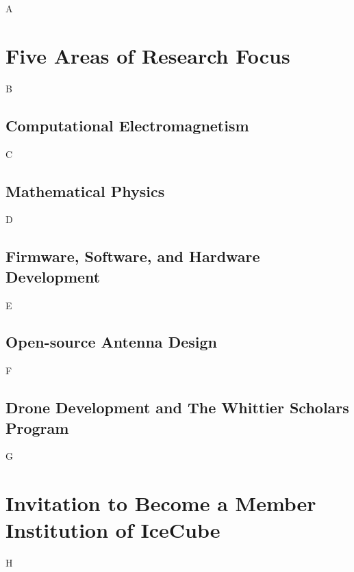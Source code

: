 \documentclass[../../../main.tex]{subfiles}
\begin{document}
A
\section{Five Areas of Research Focus}
B
\subsection{Computational Electromagnetism}
C
\subsection{Mathematical Physics}
D
\subsection{Firmware, Software, and Hardware Development}
E
\subsection{Open-source Antenna Design}
F
\subsection{Drone Development and The Whittier Scholars Program}
G
\section{Invitation to Become a Member Institution of IceCube}
H
\end{document}
